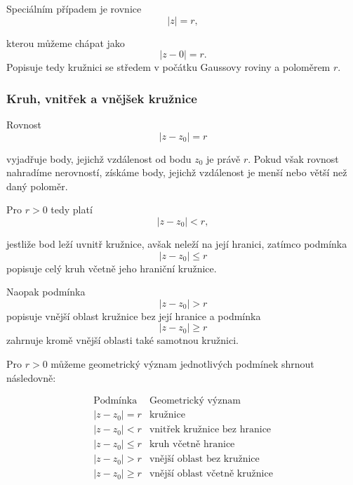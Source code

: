 \documentclass[12pt,a4paper]{article}
\begin{document}
\begin{notebox}
    Speciálním případem je rovnice
        \[
        |z|=r,
    \]

    kterou můžeme chápat jako
    \[
        |z-0|=r.
    \]
    Popisuje tedy kružnici se středem v počátku Gaussovy roviny a poloměrem $r$.
\end{notebox}


\subsubsection*{Kruh, vnitřek a vnějšek kružnice}
Rovnost
\[
    |z-z_0|=r
\]

vyjadřuje body, jejichž vzdálenost od bodu $z_0$ je právě $r$. Pokud však rovnost
nahradíme nerovností, získáme body, jejichž vzdálenost je menší nebo větší než
daný poloměr.

Pro $r>0$ tedy platí
\[
    |z-z_0|<r,
\]

jestliže bod leží uvnitř kružnice, avšak neleží na její hranici, zatímco podmínka
\[
    |z-z_0|\leq r
\]
popisuje celý kruh včetně jeho hraniční kružnice.

Naopak podmínka
\[
    |z-z_0|>r
\]
popisuje vnější oblast kružnice bez její hranice a podmínka
\[
    |z-z_0|\geq r
\]
zahrnuje kromě vnější oblasti také samotnou kružnici.

\begin{notebox}

    Pro $r>0$ můžeme geometrický význam jednotlivých podmínek shrnout následovně:

    \[
    \begin{array}{c|c}
        \text{Podmínka} & \text{Geometrický význam} \\ \hline
        |z-z_0|=r & \text{kružnice} \\
        |z-z_0|<r & \text{vnitřek kružnice bez hranice} \\
        |z-z_0|\leq r & \text{kruh včetně hranice} \\
        |z-z_0|>r & \text{vnější oblast bez kružnice} \\
        |z-z_0|\geq r & \text{vnější oblast včetně kružnice}
    \end{array}
    \]

\end{notebox}
\end{document}
